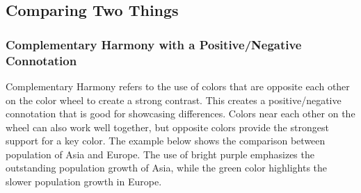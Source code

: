 \documentclass[
  letterpaper,
]{book}
\begin{document}
\hypertarget{comparing-two-things}{%
\subsection{Comparing Two Things}\label{comparing-two-things}}

\hypertarget{complementary-harmony-with-a-positivenegative-connotation}{%
\subsubsection{Complementary Harmony with a Positive/Negative
Connotation}\label{complementary-harmony-with-a-positivenegative-connotation}}

Complementary Harmony refers to the use of colors that are opposite each
other on the color wheel to create a strong contrast. This creates a
positive/negative connotation that is good for showcasing differences.
Colors near each other on the wheel can also work well together, but
opposite colors provide the strongest support for a key color. The
example below shows the comparison between population of Asia and
Europe. The use of bright purple emphasizes the outstanding population
growth of Asia, while the green color highlights the slower population
growth in Europe.
\end{document}
